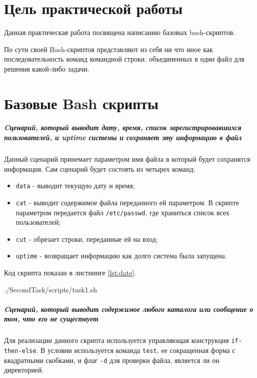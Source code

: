 \graphicspath{{~/Documents/SADT/SecondTask/}}
\chapter*{\LARGE{Цель практической работы}}
Данная практическая работа посвящена написанию базовых bash-скриптов.

По сути своей Bash-скриптов представляют из себя ни что иное как
последовательность команд командной строки, объединенных в один файл
для решения какой-либо задачи.

\chapter{Базовые Bash скрипты}

\paragraph{Cценарий, который выводит дату, время, список
зарегистрировавшихся пользователей, и uptime системы и сохраняет
эту информацию в файл}\mbox{}\par
Данный сценарий принемает параметром имя файла в который будет сохранятся
информация. Сам сценарий будет состоять из четырех команд:
\begin{itemize}
	\item \texttt{data} - выводит текущую дату и время;
	\item \texttt{cat} - выводит содержимое файла переданного ей параметром.
		В скрипте параметром передается файл \texttt{/etc/passwd},
		где храниться список всех пользователей;
	\item \texttt{cut} - обрезает строки, переданные ей на вход;
	\item \texttt{uptime} - возвращает информацию как долго система
		была запущена.
\end{itemize}

Код скрипта показан в листнинге \ref{lst:date}.

	{./SecondTask/scripts/task1.sh}

\paragraph{Cценарий, который выводит содержимое любого каталога
или сообщение о том, что его не существует}\mbox{}\par
Для реализации данного скрипта используется управляющая конструкция
\texttt{if-then-else}. В условии используется команда \texttt{test},
ее сокращенная форма с квадратными скобками, и флаг \texttt{-d}
для проверки файла, является ли он директорией.

